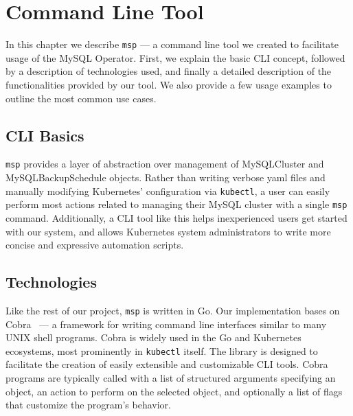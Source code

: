 \chapter{Command Line Tool}
In this chapter we describe \texttt{msp} --- a command line tool we created
to facilitate usage of the MySQL Operator. First, we explain the basic CLI
concept, followed by a description of technologies used, and finally a
detailed description of the functionalities provided by our tool. We also
provide a few usage examples to outline the most common use cases.

\section{CLI Basics}
\texttt{msp} provides a layer of abstraction over management of MySQLCluster
and MySQLBackupSchedule objects. Rather than writing verbose yaml files and manually
modifying Kubernetes’ configuration via \texttt{kubectl}, a user can easily
perform most actions related to managing their MySQL cluster with a single
\texttt{msp} command. Additionally, a CLI tool like this helps inexperienced users
get started with our system, and allows Kubernetes system administrators to
write more concise and expressive automation scripts.

\section{Technologies}
Like the rest of our project, \texttt{msp} is written in Go. Our implementation
bases on Cobra~\cite{cobra} --- a framework for writing command line interfaces
similar to many UNIX shell programs. Cobra is widely used in the Go and
Kubernetes ecosystems, most prominently in \texttt{kubectl} itself. The
library is designed to facilitate the creation of easily extensible and
customizable CLI tools. Cobra programs are typically called with a list
of structured arguments specifying an object, an action to perform on the
selected object, and optionally a list of flags that customize the program’s
behavior.

